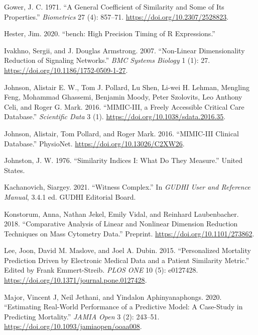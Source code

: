 \documentclass{article}
\newlength{\cslhangindent}
\newlength{\cslentryspacingunit} %
\newenvironment{CSLReferences}[2] %
 {%
  \setlength{\parindent}{0pt}
  \ifodd #1
  \let\oldpar\par
  \def\par{\hangindent=\cslhangindent\oldpar}
  \fi
  \setlength{\parskip}{#2\cslentryspacingunit}
 }%
 {}
\begin{document}
\begin{CSLReferences}{1}{0}
\leavevmode{}%
Gower, J. C. 1971. {``A {General Coefficient} of {Similarity} and {Some}
of {Its Properties}.''} \emph{Biometrics} 27 (4): 857--71.
\url{https://doi.org/10.2307/2528823}.

\leavevmode{}%
Hester, Jim. 2020. {``{bench}: {High Precision Timing} of {R
Expressions}.''}

\leavevmode{}%
Ivakhno, Sergii, and J. Douglas Armstrong. 2007. {``Non-Linear
Dimensionality Reduction of Signaling Networks.''} \emph{BMC Systems
Biology} 1 (1): 27. \url{https://doi.org/10.1186/1752-0509-1-27}.

\leavevmode{}%
Johnson, Alistair E. W., Tom J. Pollard, Lu Shen, Li-wei H. Lehman,
Mengling Feng, Mohammad Ghassemi, Benjamin Moody, Peter Szolovits, Leo
Anthony Celi, and Roger G. Mark. 2016. {``{MIMIC-III}, a Freely
Accessible Critical Care Database.''} \emph{Scientific Data} 3 (1).
\url{https://doi.org/10.1038/sdata.2016.35}.

\leavevmode{}%
Johnson, Alistair, Tom Pollard, and Roger Mark. 2016. {``{MIMIC-III
Clinical Database}.''} {PhysioNet}.
\url{https://doi.org/10.13026/C2XW26}.

\leavevmode{}%
Johnston, J. W. 1976. {``Similarity Indices {I}: What Do They
Measure.''} {United States}.

\leavevmode{}%
Kachanovich, Siargey. 2021. {``Witness Complex.''} In \emph{{GUDHI User}
and {Reference Manual}}, 3.4.1 ed. {GUDHI Editorial Board}.

\leavevmode{}%
Konstorum, Anna, Nathan Jekel, Emily Vidal, and Reinhard Laubenbacher.
2018. {``Comparative {Analysis} of {Linear} and {Nonlinear Dimension
Reduction Techniques} on {Mass Cytometry Data}.''} Preprint.
\url{https://doi.org/10.1101/273862}.

\leavevmode{}%
Lee, Joon, David M. Maslove, and Joel A. Dubin. 2015. {``Personalized
{Mortality Prediction Driven} by {Electronic Medical Data} and a
{Patient Similarity Metric}.''} Edited by Frank Emmert-Streib.
\emph{PLOS ONE} 10 (5): e0127428.
\url{https://doi.org/10.1371/journal.pone.0127428}.

\leavevmode{}%
Major, Vincent J, Neil Jethani, and Yindalon Aphinyanaphongs. 2020.
{``Estimating Real-World Performance of a Predictive Model: A Case-Study
in Predicting Mortality.''} \emph{JAMIA Open} 3 (2): 243--51.
\url{https://doi.org/10.1093/jamiaopen/ooaa008}.


\end{CSLReferences}
\end{document}
